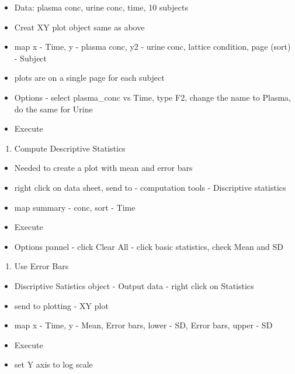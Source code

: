 \documentclass[
  letterpaper,
  DIV=11,
  numbers=noendperiod]{scrreprt}
\providecommand{\tightlist}{%
  \setlength{\itemsep}{0pt}\setlength{\parskip}{0pt}}\usepackage{longtable,booktabs,array}
\begin{document}
\begin{itemize}
\tightlist
\item
  Data: plasma conc, urine conc, time, 10 subjects
\item
  Creat XY plot object same as above
\item
  map x - Time, y - plasma conc, y2 - urine conc, lattice condition,
  page (sort) - Subject
\item
  plots are on a single page for each subject
\item
  Options - select plasma\_conc vs Time, type F2, change the name to
  Plasma, do the same for Urine
\item
  Execute
\end{itemize}

\begin{enumerate}
\def\labelenumi{\arabic{enumi}.}
\setcounter{enumi}{3}
\tightlist
\item
  Compute Descriptive Statistics
\end{enumerate}

\begin{itemize}
\tightlist
\item
  Needed to create a plot with mean and error bars
\item
  right click on data sheet, send to - computation tools - Discriptive
  statistics
\item
  map summary - conc, sort - Time
\item
  Execute
\item
  Options pannel - click Clear All - click basic statistics, check Mean
  and SD
\end{itemize}

\begin{enumerate}
\def\labelenumi{\arabic{enumi}.}
\setcounter{enumi}{4}
\tightlist
\item
  Use Error Bars
\end{enumerate}

\begin{itemize}
\tightlist
\item
  Discriptive Satistics object - Output data - right click on Statistics
\item
  send to plotting - XY plot
\item
  map x - Time, y - Mean, Error bars, lower - SD, Error bars, upper - SD
\item
  Execute
\item
  set Y axis to log scale
\end{itemize}
\end{document}
